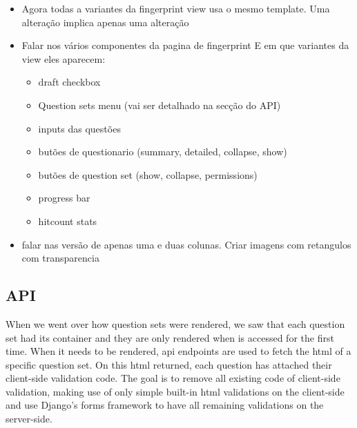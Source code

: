 \begin{itemize}
    \item Agora todas a variantes da fingerprint view usa o mesmo template. Uma alteração implica apenas uma alteração
    \item Falar nos vários componentes da pagina de fingerprint E em que variantes da view eles aparecem:
        \begin{itemize}
            \item draft checkbox
            \item Question sets menu (vai ser detalhado na secção do API)
            \item inputs das questões
            \item butões de questionario (summary, detailed, collapse, show)
            \item butões de question set (show, collapse, permissions)
            \item progress bar
            \item hitcount stats
        \end{itemize}
    \item falar nas versão de apenas uma e duas colunas. Criar imagens com retangulos com transparencia
\end{itemize}

\subsection{API}


When we went over how question sets were rendered, we saw that each question set had its container and they are only rendered when is accessed for the first time.
When it needs to be rendered, \gls{api} endpoints are used to fetch the \gls{html} of a specific question set.
On this \gls{html} returned, each question has attached their client-side validation code.
The goal is to remove all existing code of client-side validation, making use of only simple built-in \gls{html} validations on the client-side and use Django's forms framework to have all remaining validations on the server-side.

